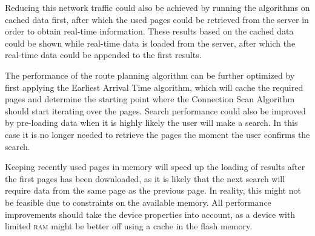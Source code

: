 \documentclass[twocolumn]{phdsymp} %
\begin{document}
Reducing this network traffic could also be achieved by running the algorithms on cached data first, after which the used pages could be retrieved from the server in order to obtain real-time information. These results based on the cached data could be shown while real-time data is loaded from the server, after which the real-time data could be appended to the first results.

The performance of the route planning algorithm can be further optimized by first applying the Earliest Arrival Time algorithm, which will cache the required pages and determine the starting point where the Connection Scan Algorithm should start iterating over the pages. Search performance could also be improved by pre-loading data when it is highly likely the user will make a search. In this case it is no longer needed to retrieve the pages the moment the user confirms the search.

Keeping recently used pages in memory will speed up the loading of results after the first pages has been downloaded, as it is likely that the next search will require data from the same page as the previous page. In reality, this might not be feasible due to constraints on the available memory. All performance improvements should take the device properties into account, as a device with limited \textsc{ram} might be better off using a cache in the flash memory.

\nocite{*}

\end{document}
